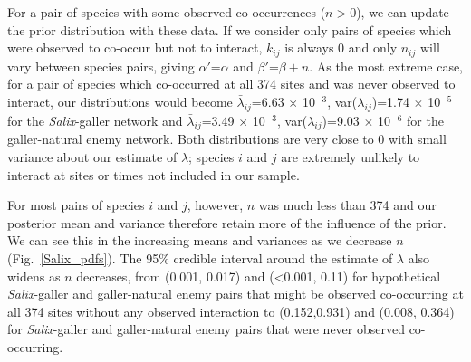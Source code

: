 \documentclass[12pt]{article}
\begin{document}
      For a pair of species with some observed co-occurrences ($n>0$), we can update the prior distribution with these data. If we consider only pairs of species which were observed to co-occur but not to interact, $k_{ij}$ is always 0 and only $n_{ij}$ will vary between species pairs, giving $\alpha'$=$\alpha$ and $\beta'$=$\beta + n$. As the most extreme case, for a pair of species which co-occurred at all 374 sites and was never observed to interact, our distributions would become 
      $\bar\lambda_{ij}$=6.63 $\times$ 10$^{-3}$, var($\lambda_{ij}$)=1.74 $\times$ 10$^{-5}$ for the \emph{Salix}-galler network and 
      $\bar\lambda_{ij}$=3.49 $\times$ 10$^{-3}$, var($\lambda_{ij}$)=9.03 $\times$ 10$^{-6}$ for the galler-natural enemy network. Both distributions are very close to 0 with small variance about our estimate of $\lambda$; species $i$ and $j$ are extremely unlikely to interact at sites or times not included in our sample.


      For most pairs of species $i$ and $j$, however, $n$ was much less than 374 and our posterior mean and variance therefore retain more of the influence of the prior. We can see this in the increasing means and variances as we decrease $n$ (Fig.~\ref{Salix_pdfs}). The 95\% credible interval around the estimate of $\lambda$ also widens as $n$ decreases, from (0.001, 0.017) and (\textless0.001, 0.11) for hypothetical \emph{Salix}-galler and galler-natural enemy pairs that might be observed co-occurring at all 374 sites without any observed interaction to (0.152,0.931) and (0.008, 0.364) for \emph{Salix}-galler and galler-natural enemy pairs that were never observed co-occurring.



\end{document}
